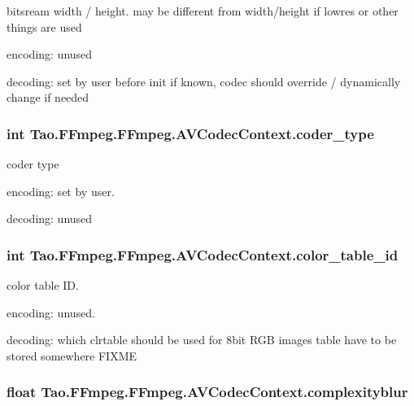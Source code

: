 \label{struct_tao_1_1_f_fmpeg_1_1_f_fmpeg_1_1_a_v_codec_context_a461b1a630112ab3e27e22ab2dc11aefc}
bitsream width / height. may be different from width/height if lowres or other things are used
\begin{DoxyItemize}
\item encoding: unused
\item decoding: set by user before init if known, codec should override / dynamically change if needed 
\end{DoxyItemize}\hypertarget{struct_tao_1_1_f_fmpeg_1_1_f_fmpeg_1_1_a_v_codec_context_a5d2309f9f6b946d971df16b3f461e663}{
\subsubsection[{coder\_\-type}]{\setlength{\rightskip}{0pt plus 5cm}int {\bf Tao.FFmpeg.FFmpeg.AVCodecContext.coder\_\-type}}}
\label{struct_tao_1_1_f_fmpeg_1_1_f_fmpeg_1_1_a_v_codec_context_a5d2309f9f6b946d971df16b3f461e663}
coder type
\begin{DoxyItemize}
\item encoding: set by user.
\item decoding: unused 
\end{DoxyItemize}\hypertarget{struct_tao_1_1_f_fmpeg_1_1_f_fmpeg_1_1_a_v_codec_context_adb27ffb227ada0a0008687c823164fcb}{
\subsubsection[{color\_\-table\_\-id}]{\setlength{\rightskip}{0pt plus 5cm}int {\bf Tao.FFmpeg.FFmpeg.AVCodecContext.color\_\-table\_\-id}}}
\label{struct_tao_1_1_f_fmpeg_1_1_f_fmpeg_1_1_a_v_codec_context_adb27ffb227ada0a0008687c823164fcb}
color table ID.
\begin{DoxyItemize}
\item encoding: unused.
\item decoding: which clrtable should be used for 8bit RGB images table have to be stored somewhere FIXME 
\end{DoxyItemize}\hypertarget{struct_tao_1_1_f_fmpeg_1_1_f_fmpeg_1_1_a_v_codec_context_ab2a993d94bcdd15ca8914651266a7293}{
\subsubsection[{complexityblur}]{\setlength{\rightskip}{0pt plus 5cm}float {\bf Tao.FFmpeg.FFmpeg.AVCodecContext.complexityblur}}}
